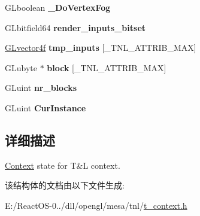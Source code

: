 \begin{DoxyCompactItemize}
G\+Lboolean {\bfseries \+\_\+\+Do\+Vertex\+Fog}
\item 
\mbox{\label{struct_t_n_lcontext_a2da245690f8a3907a6907a0282474d00}} 
G\+Lbitfield64 {\bfseries render\+\_\+inputs\+\_\+bitset}
\item 
\mbox{\label{struct_t_n_lcontext_a0a4643a1058ca29fb2141f090f247110}} 
\hyperlink{struct_g_lvector4f}{G\+Lvector4f} {\bfseries tmp\+\_\+inputs} \mbox{[}\+\_\+\+T\+N\+L\+\_\+\+A\+T\+T\+R\+I\+B\+\_\+\+M\+AX\mbox{]}
\item 
\mbox{\label{struct_t_n_lcontext_ade5c63c439b71080d69602831234bed5}} 
G\+Lubyte $\ast$ {\bfseries block} \mbox{[}\+\_\+\+T\+N\+L\+\_\+\+A\+T\+T\+R\+I\+B\+\_\+\+M\+AX\mbox{]}
\item 
\mbox{\label{struct_t_n_lcontext_ab6b510df5da6229b70304bc3bdc40f2f}} 
G\+Luint {\bfseries nr\+\_\+blocks}
\item 
\mbox{\label{struct_t_n_lcontext_ad194b5f9d96a5c6fd3eaaed52f5911cb}} 
G\+Luint {\bfseries Cur\+Instance}
\end{DoxyCompactItemize}


\subsection{详细描述}
\hyperlink{struct_context}{Context} state for T\&L context. 

该结构体的文档由以下文件生成\+:\begin{DoxyCompactItemize}
\item 
E\+:/\+React\+O\+S-\/0../dll/opengl/mesa/tnl/\hyperlink{t__context_8h}{t\+\_\+context.\+h}\end{DoxyCompactItemize}
